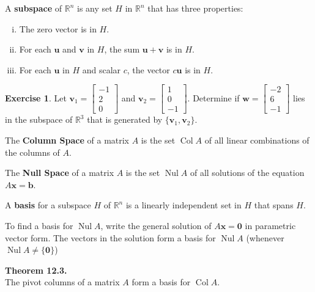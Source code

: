 \documentclass[10pt]{book}
\newcommand{\boxcolor}{gray!30}
\newenvironment{boxme}{\begin{mdframed}[backgroundcolor=\boxcolor,linewidth=0pt,nobreak=true]}{\end{mdframed}}
\newenvironment{boxthm}{\begin{mdframed}[backgroundcolor=\boxcolor,nobreak=true]}{\end{mdframed}}
\newenvironment{boxdef}{\begin{mdframed}[backgroundcolor=\boxcolor,linewidth=0pt,nobreak=true]}{\end{mdframed}}
\theoremstyle{definition}
\newtheorem{exercise}{Exercise}[section]
\newcommand{\vect}[1]{\ensuremath{\boldsymbol{\mathbf{#1}}}}
\DeclareMathOperator{\Nul}{Nul}
\DeclareMathOperator{\Col}{Col}
\newcommand{\Axz}{A\vect{x}=\vect{0}}
\begin{document}
\begin{boxdef}
A {\bf subspace} of $\mathbb{R}^n$ is any set $H$ in $\mathbb{R}^n$ that has three properties:
\begin{enumerate}[(i)]
	\item The zero vector is in $H$.
	\item For each $\vect{u}$ and $\vect{v}$ in $H$, the sum $\vect{u}+\vect{v}$ is in $H$.
	\item For each $\vect{u}$ in $H$ and scalar $c$, the vector $c\vect{u}$ is in $H$.
\end{enumerate}
\end{boxdef}

\begin{exercise}

Let $\vect{v}_1 = \begin{bmatrix}-1\\2\\0\end{bmatrix}$ and $\vect{v}_2 = \begin{bmatrix} 1\\0\\-1\end{bmatrix}$. Determine if $\vect{w} = \begin{bmatrix}-2\\6\\-1\end{bmatrix}$ lies in the subspace of $\mathbb{R}^3$ that is generated by $\{ \vect{v}_1,\vect{v}_2 \}$.
\end{exercise}

\vfill

\begin{boxdef}
The {\bf Column Space} of a matrix $A$ is the set $\Col A$ of all linear combinations of the columns of $A$.
\end{boxdef}

\begin{boxdef}
The {\bf Null Space} of a matrix $A$ is the set $\Nul A$ of all solutions of the equation $A\vect{x}=\vect{b}$.
\end{boxdef}


\begin{boxdef}
A {\bf basis} for a subspace $H$ of $\mathbb{R}^n$ is a linearly independent set in $H$ that spans $H$.
\end{boxdef}



\begin{boxme}
	To find a basis for $\Nul A$, write the general solution of $\Axz$ in parametric vector form. The vectors in the solution form a basis for $\Nul A$ (whenever $\Nul A \neq \{\vect{0}\}$)
\end{boxme}
\begin{boxthm}
	\textbf{Theorem 12.3.} \\
	The pivot columns of a matrix $A$ form a basis for $\Col A$.
\end{boxthm}
\end{document}
